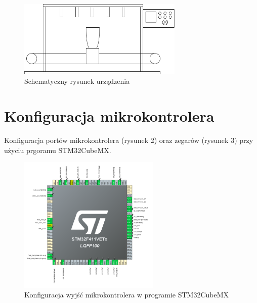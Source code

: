 \documentclass[10pt, a4paper]{article}
\begin{document}
\begin{figure}[H]
	\centering
	\includegraphics[width=0.7\textwidth]{figures/dionizos.png}
	\caption{Schematyczny rysunek urządzenia}
	\label{fig:Architektura}
\end{figure}

\section{Konfiguracja mikrokontrolera}
 
Konfiguracja portów mikrokontrolera (rysunek 2) oraz zegarów (rysunek 3) przy użyciu prgoramu STM32CubeMX.
 
\begin{figure}[H]
	\centering
	\includegraphics[width=0.6\textwidth]{nowa_konfiguracja.PNG}
	\caption{Konfiguracja wyjść mikrokontrolera w programie STM32CubeMX}
	\label{fig:KonfiguracjaMikrokontrolera}
\end{figure}
\end{document}
